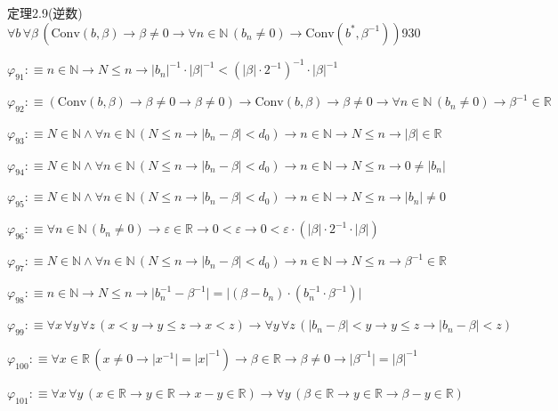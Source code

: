 \begin{fullproof}{定理2.9(逆数)}{$\forall b\,\forall \beta\,(\mathrm{Conv}(b,\beta) \to \beta \neq 0 \to \forall n \in \mathbb{N}\,(b_{n} \neq 0) \to \mathrm{Conv}(b^{\ast},\beta^{-1}))$}{930}
\begin{abbrevlist}
\item $\varphi_{91} :\equiv n \in \mathbb{N} \to N \leq n \to \lvert b_{n} \rvert^{-1} \cdot \lvert \beta \rvert^{-1} < (\lvert \beta \rvert \cdot 2^{-1})^{-1} \cdot \lvert \beta \rvert^{-1}$
\item $\varphi_{92} :\equiv (\mathrm{Conv}(b,\beta) \to \beta \neq 0 \to \beta \neq 0) \to \mathrm{Conv}(b,\beta) \to \beta \neq 0 \to \forall n \in \mathbb{N}\,(b_{n} \neq 0) \to \beta^{-1} \in \mathbb{R}$
\item $\varphi_{93} :\equiv N \in \mathbb{N} \land \forall n \in \mathbb{N}\,(N \leq n \to \lvert b_{n} - \beta \rvert < d_{0}) \to n \in \mathbb{N} \to N \leq n \to \lvert \beta \rvert \in \mathbb{R}$
\item $\varphi_{94} :\equiv N \in \mathbb{N} \land \forall n \in \mathbb{N}\,(N \leq n \to \lvert b_{n} - \beta \rvert < d_{0}) \to n \in \mathbb{N} \to N \leq n \to 0 \neq \lvert b_{n} \rvert$
\item $\varphi_{95} :\equiv N \in \mathbb{N} \land \forall n \in \mathbb{N}\,(N \leq n \to \lvert b_{n} - \beta \rvert < d_{0}) \to n \in \mathbb{N} \to N \leq n \to \lvert b_{n} \rvert \neq 0$
\item $\varphi_{96} :\equiv \forall n \in \mathbb{N}\,(b_{n} \neq 0) \to \varepsilon \in \mathbb{R} \to 0 < \varepsilon \to 0 < \varepsilon \cdot (\lvert \beta \rvert \cdot 2^{-1} \cdot \lvert \beta \rvert)$
\item $\varphi_{97} :\equiv N \in \mathbb{N} \land \forall n \in \mathbb{N}\,(N \leq n \to \lvert b_{n} - \beta \rvert < d_{0}) \to n \in \mathbb{N} \to N \leq n \to \beta^{-1} \in \mathbb{R}$
\item $\varphi_{98} :\equiv n \in \mathbb{N} \to N \leq n \to \lvert b_{n}^{-1} - \beta^{-1} \rvert = \lvert (\beta - b_{n}) \cdot (b_{n}^{-1} \cdot \beta^{-1}) \rvert$
\item $\varphi_{99} :\equiv \forall x\,\forall y\,\forall z\,(x < y \to y \leq z \to x < z) \to \forall y\,\forall z\,(\lvert b_{n} - \beta \rvert < y \to y \leq z \to \lvert b_{n} - \beta \rvert < z)$
\item $\varphi_{100} :\equiv \forall x \in \mathbb{R}\,(x \neq 0 \to \lvert x^{-1} \rvert = \lvert x \rvert^{-1}) \to \beta \in \mathbb{R} \to \beta \neq 0 \to \lvert \beta^{-1} \rvert = \lvert \beta \rvert^{-1}$
\item $\varphi_{101} :\equiv \forall x\,\forall y\,(x \in \mathbb{R} \to y \in \mathbb{R} \to x - y \in \mathbb{R}) \to \forall y\,(\beta \in \mathbb{R} \to y \in \mathbb{R} \to \beta - y \in \mathbb{R})$

\end{abbrevlist}
\end{fullproof}
